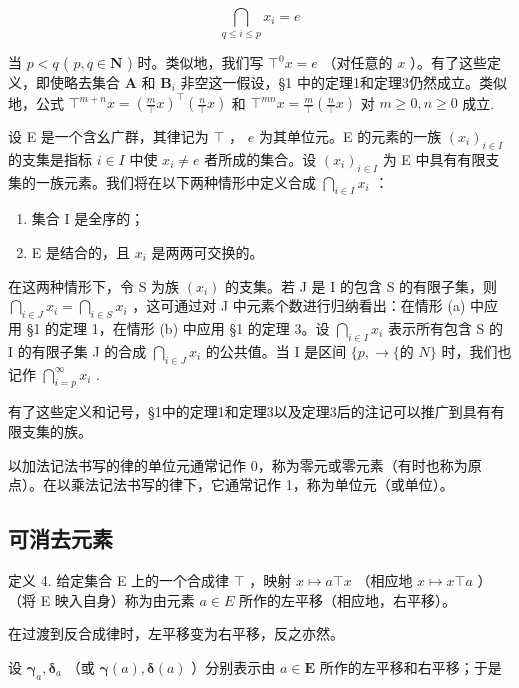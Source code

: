 \[
\bigcap_ {q \leqslant i \leqslant p} x _ {i} = e
\]

当 \(p < q\) ( \(p, q \in \mathbf{N}\) ) 时。类似地，我们写 \(\top^0 x = e\) （对任意的 \(x\) ）。有了这些定义，即使略去集合 \(\mathbf{A}\) 和 \(\mathbf{B}_i\) 非空这一假设，§1 中的定理1和定理3仍然成立。类似地，公式 \(\top^{m+n} x = \left( \frac{m}{\top} x \right)^{\top} \left( \frac{n}{\top} x \right)\) 和 \(\top^{mn} x = \frac{m}{\top} \left( \frac{n}{\top} x \right)\) 对 \(m \geqslant 0, n \geqslant 0\) 成立.

设 E 是一个含幺广群，其律记为 \(\top\) ， \(e\) 为其单位元。E 的元素的一族 \((x_{i})_{i\in I}\) 的支集是指标 \(i\in I\) 中使 \(x_{i}\neq e\) 者所成的集合。设 \((x_{i})_{i\in I}\) 为 E 中具有有限支集的一族元素。我们将在以下两种情形中定义合成 \(\bigcap_{i\in I}x_{i}\) ：

\begin{enumerate}
\def\labelenumi{(\alph{enumi})}
\item
  集合 I 是全序的；
\item
  E 是结合的，且 \(x_{i}\) 是两两可交换的。
\end{enumerate}

在这两种情形下，令 S 为族 \((x_{i})\) 的支集。若 J 是 I 的包含 S 的有限子集，则 \(\bigcap_{i\in J}x_{i} = \bigcap_{i\in S}x_{i}\) ，这可通过对 J 中元素个数进行归纳看出：在情形 (a) 中应用 §1 的定理 1，在情形 (b) 中应用 §1 的定理 3。设 \(\bigcap_{i\in I}x_{i}\) 表示所有包含 S 的 I 的有限子集 J 的合成 \(\bigcap_{i\in J}x_{i}\) 的公共值。当 I 是区间 \(\{p,\rightarrow\{\text{的 }N\}\) 时，我们也记作 \(\bigcap_{i=p}^{\infty}x_{i}\) .

有了这些定义和记号，§1中的定理1和定理3以及定理3后的注记可以推广到具有有限支集的族。

以加法记法书写的律的单位元通常记作 0，称为零元或零元素（有时也称为原点）。在以乘法记法书写的律下，它通常记作 1，称为单位元（或单位）。

\subsection{可消去元素}

定义 4. 给定集合 E 上的一个合成律 \(\top\) ，映射 \(x \mapsto a \top x\) （相应地 \(x \mapsto x \top a\) ）（将 E 映入自身）称为由元素 \(a \in E\) 所作的左平移（相应地，右平移）。

在过渡到反合成律时，左平移变为右平移，反之亦然。

设 \(\pmb{\gamma}_{a},\pmb{\delta}_{a}\) （或 \(\pmb {\gamma}(a),\pmb {\delta}(a)\) ）分别表示由 \(a\in \mathbf{E}\) 所作的左平移和右平移；于是


